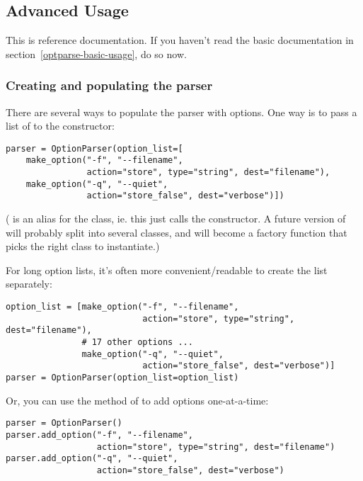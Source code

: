 \subsection{Advanced Usage\label{optparse-advanced-usage}}

This is reference documentation.  If you haven't read the basic
documentation in section~\ref{optparse-basic-usage}, do so now.

\subsubsection{Creating and populating the
               parser\label{optparse-creating-the-parser}}

There are several ways to populate the parser with options.  One way
is to pass a list of  to the 
constructor:

\begin{verbatim}
parser = OptionParser(option_list=[
    make_option("-f", "--filename",
                action="store", type="string", dest="filename"),
    make_option("-q", "--quiet",
                action="store_false", dest="verbose")])
\end{verbatim}

( is an alias for
the  class, ie. this just calls the 
constructor.  A future version of  will probably
split  into several classes, and
 will become a factory function that picks the
right class to instantiate.)

For long option lists, it's often more convenient/readable to create the
list separately:

\begin{verbatim}
option_list = [make_option("-f", "--filename",
                           action="store", type="string", dest="filename"),
               # 17 other options ...
               make_option("-q", "--quiet",
                           action="store_false", dest="verbose")]
parser = OptionParser(option_list=option_list)
\end{verbatim}

Or, you can use the  method of
 to add options one-at-a-time:

\begin{verbatim}
parser = OptionParser()
parser.add_option("-f", "--filename",
                  action="store", type="string", dest="filename")
parser.add_option("-q", "--quiet",
                  action="store_false", dest="verbose")
\end{verbatim}

